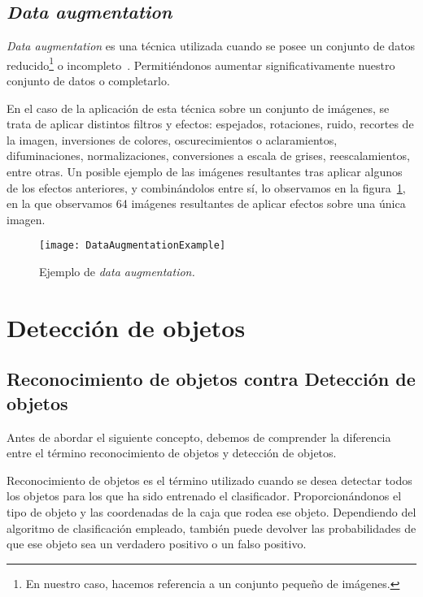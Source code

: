 \subsection{\textit{Data augmentation}}

\textit{Data augmentation} es una técnica utilizada cuando se posee un conjunto de datos reducido\footnote{En nuestro caso, hacemos referencia a un conjunto pequeño de imágenes.} o incompleto~\cite{emalgorithm}. Permitiéndonos aumentar significativamente nuestro conjunto de datos o completarlo. 

En el caso de la aplicación de esta técnica sobre un conjunto de imágenes, se trata de aplicar distintos filtros y efectos: espejados, rotaciones, ruido, recortes de la imagen, inversiones de colores, oscurecimientos o aclaramientos, difuminaciones, normalizaciones, conversiones a escala de grises, reescalamientos, entre otras. Un posible ejemplo de las imágenes resultantes tras aplicar algunos de los efectos anteriores, y combinándolos entre sí, lo observamos en la figura~\ref{fig:3.4.1}, en la que observamos 64 imágenes resultantes de aplicar efectos sobre una única imagen.

\begin{figure}
\centering
\texttt{[image: DataAugmentationExample]}
\caption{Ejemplo de \textit{data augmentation.}}
\label{fig:3.4.1}
\end{figure}

\section{Detección de objetos}

\subsection{Reconocimiento de objetos contra Detección de objetos}

Antes de abordar el siguiente concepto, debemos de comprender la diferencia entre el término reconocimiento de objetos y detección de objetos.

Reconocimiento de objetos es el término utilizado cuando se desea detectar todos los objetos para los que ha sido entrenado el clasificador. Proporcionándonos el tipo de objeto y las coordenadas de la caja que rodea ese objeto. Dependiendo del algoritmo de clasificación empleado, también puede devolver las probabilidades de que ese objeto sea un verdadero positivo o un falso positivo.

